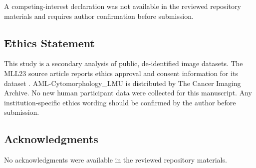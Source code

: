 A competing-interest declaration was not available in the reviewed repository materials and requires author confirmation before submission.

\subsection*{Ethics Statement}

This study is a secondary analysis of public, de-identified image datasets. The MLL23 source article reports ethics approval and consent information for its dataset \cite{mll23_nature_2025}. AML-Cytomorphology\_LMU is distributed by The Cancer Imaging Archive. No new human participant data were collected for this manuscript. Any institution-specific ethics wording should be confirmed by the author before submission.

\subsection*{Acknowledgments}

No acknowledgments were available in the reviewed repository materials.
